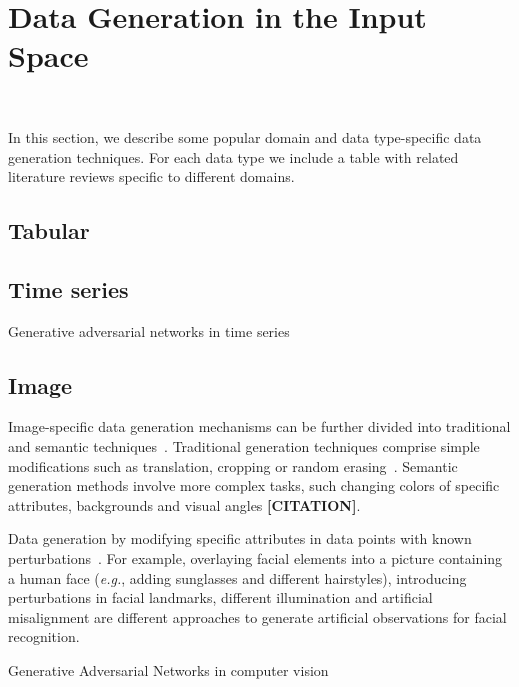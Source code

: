 \documentclass[parskip=full]{scrartcl}
\begin{document}
\section{Data Generation in the Input Space}~\label{sec:input-space}

In this section, we describe some popular domain and data type-specific data
generation techniques. For each data type we include a table with related
literature reviews specific to different domains.

\subsection{Tabular}

\subsection{Time series}

Generative adversarial networks in time series 

\subsection{Image}

Image-specific data generation mechanisms can be further divided into
traditional and semantic techniques~\cite{wang2021regularizing}. Traditional
generation techniques comprise simple modifications such as translation,
cropping or random erasing~\cite{zhong2017random}. Semantic generation methods
involve more complex tasks, such changing colors of specific attributes,
backgrounds and visual angles \textbf{[CITATION]}. 

Data generation by modifying specific attributes in data points with known
perturbations~\cite{lv2017data}. For example, overlaying facial elements into
a picture containing a human face (\textit{e.g.}, adding sunglasses and
different hairstyles), introducing perturbations in facial landmarks,
different illumination and artificial misalignment are different approaches to
generate artificial observations for facial recognition.

Generative Adversarial Networks in computer vision~\cite{wang2021generative}
\end{document}
